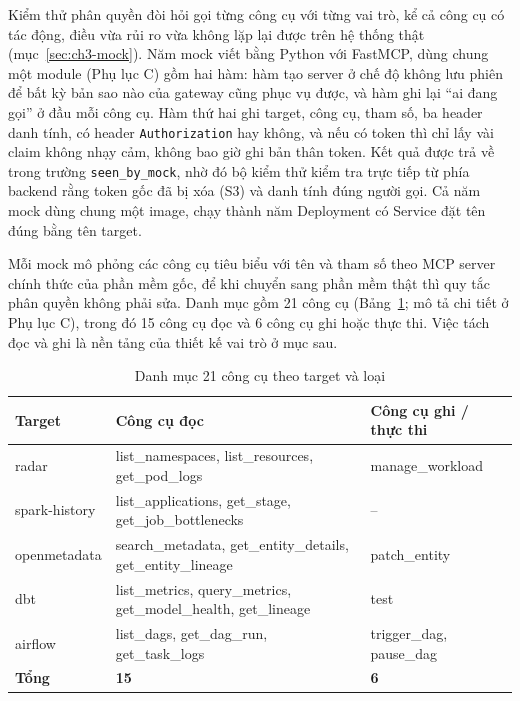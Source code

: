 \documentclass[a4paper]{article}
\begin{document}
Kiểm thử phân quyền đòi hỏi gọi từng công cụ với từng vai trò, kể cả công cụ có tác động, điều vừa rủi ro vừa không lặp lại được trên hệ thống thật (mục~\ref{sec:ch3-mock}). Năm mock viết bằng Python với FastMCP, dùng chung một module (Phụ lục C) gồm hai hàm: hàm tạo server ở chế độ không lưu phiên để bất kỳ bản sao nào của gateway cũng phục vụ được, và hàm ghi lại ``ai đang gọi'' ở đầu mỗi công cụ. Hàm thứ hai ghi target, công cụ, tham số, ba header danh tính, có header \texttt{Authorization} hay không, và nếu có token thì chỉ lấy vài claim không nhạy cảm, không bao giờ ghi bản thân token. Kết quả được trả về trong trường \texttt{seen\_by\_mock}, nhờ đó bộ kiểm thử kiểm tra trực tiếp từ phía backend rằng token gốc đã bị xóa (S3) và danh tính đúng người gọi. Cả năm mock dùng chung một image, chạy thành năm Deployment có Service đặt tên đúng bằng tên target.

Mỗi mock mô phỏng các công cụ tiêu biểu với tên và tham số theo MCP server chính thức của phần mềm gốc, để khi chuyển sang phần mềm thật thì quy tắc phân quyền không phải sửa. Danh mục gồm 21 công cụ (Bảng~\ref{tab:tools}; mô tả chi tiết ở Phụ lục C), trong đó 15 công cụ đọc và 6 công cụ ghi hoặc thực thi. Việc tách đọc và ghi là nền tảng của thiết kế vai trò ở mục sau.

\begin{table}[H]\centering\caption{Danh mục 21 công cụ theo target và loại}\label{tab:tools}
{\singlespacing\renewcommand{\arraystretch}{1.15}\small
\begin{tabularx}{\textwidth}{|p{2.3cm}|X|p{3.6cm}|}\hline
\textbf{Target} & \textbf{Công cụ đọc} & \textbf{Công cụ ghi / thực thi} \\ \hline
radar & list\_namespaces, list\_resources, get\_pod\_logs & manage\_workload \\ \hline
spark-history & list\_applications, get\_stage, get\_job\_bottlenecks & -- \\ \hline
openmetadata & search\_metadata, get\_entity\_details, get\_entity\_lineage & patch\_entity \\ \hline
dbt & list\_metrics, query\_metrics, get\_model\_health, get\_lineage & test \\ \hline
airflow & list\_dags, get\_dag\_run, get\_task\_logs & trigger\_dag, pause\_dag \\ \hline
\textbf{Tổng} & \textbf{15} & \textbf{6} \\ \hline
\end{tabularx}}\end{table}
\end{document}

